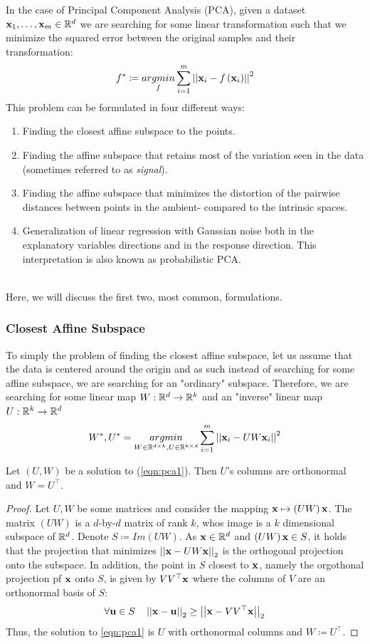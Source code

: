 In the case of Principal Component Analysis (PCA), given a dataset $\mathbf{x}_1,\ldots,\mathbf{x}_m\in\mathbb{R}^d$ we are searching for some linear transformation such that we minimize the squared error between the original samples and their transformation:
\begin{equation}
f^*\coloneqq\underset{f}{argmin} \sum^m_{i=1}\left|\left| \mathbf{x}_i - f\left(\mathbf{x}_i\right)\right|\right|^2
\end{equation}
This problem can be formulated in four different ways:
\begin{enumerate}
	\item Finding the closest affine subspace to the points.
	\item Finding the affine subspace that retains most of the variation seen in the data (sometimes referred to as \textit{signal}).
	\item Finding the affine subspace that minimizes the distortion of the pairwise distances between points in the ambient- compared to the intrinsic spaces.
	\item Generalization of linear regression with Gaussian noise both in the explanatory variables directions and in the response direction. This interpretation is also known as probabilistic PCA.
\end{enumerate}~\\
Here, we will discuss the first two, most common, formulations.

\subsubsection{Closest Affine Subspace}
To simply the problem of finding the closest affine subspace, let us assume that the data is centered around the origin and as such instead of searching for some affine subspace, we are searching for an "ordinary" subspace. Therefore, we are searching for some linear map $W:\mathbb{R}^d\rightarrow\mathbb{R}^k$ and an "inverse" linear map $U:\mathbb{R}^k\rightarrow\mathbb{R}^d$
\begin{equation}
W^*,U^* = \underset{W\in\mathbb{R}^{d\times k},U\in\mathbb{R}^{k\times d}}{argmin} \sum_{i=1}^m \left|\left| \mathbf{x}_i-UW\mathbf{x}_i\right|\right|^2
\label{eqn:pca1}
\end{equation}


\begin{lemma}
Let $\left(U,W\right)$ be a solution to (\ref{eqn:pca1}). Then $U$'s columns are orthonormal and $W=U^\top$.
\end{lemma}
\begin{proof}
Let $U,W$ be some matrices and consider the mapping $\mathbf{x}\mapsto \left(UW\right)\mathbf{x}$. The matrix $\left(UW\right)$ is a $d$-by-$d$ matrix of rank $k$, whos image is a $k$ dimensional subspace of $\mathbb{R}^d$. Denote $S\coloneqq Im\left(UW\right)$. As $\mathbf{x}\in\mathbb{R}^d$ and $\left(UW\right)\mathbf{x}\in S$, it holds that the projection that minimizes $\left|\left| \mathbf{x}-UW\mathbf{x}\right|\right|_2$ is the orthogonal projection onto the subspace. In addition, the point in $S$ closest to $\mathbf{x}$, namely the orgothonal projection pf $\mathbf{x}$ onto $S$, is given by $VV^\top\mathbf{x}$ where the columns of $V$ are an orthonormal basis of $S$:
$$ \forall \mathbf{u}\in S\quad \left|\left| \mathbf{x}-\mathbf{u}\right|\right|_2 \geq \left|\left| \mathbf{x}-VV^\top\mathbf{x}\right|\right|_2 $$
Thus, the solution to \ref{eqn:pca1} is $U$ with orthonormal columns and $W\coloneqq U^\top$. 
\end{proof}


